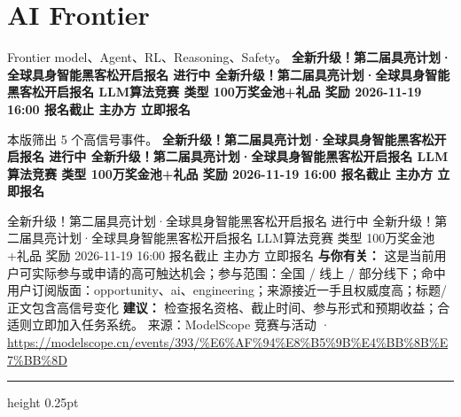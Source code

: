 \documentclass[10.5pt]{ctexart}
\begin{document}
\section*{AI Frontier}
{\color{ormuted} Frontier model、Agent、RL、Reasoning、Safety。}
\vspace{2mm}
{\LARGE\bfseries 全新升级！第二届具亮计划·全球具身智能黑客松开启报名 进行中 全新升级！第二届具亮计划·全球具身智能黑客松开启报名 LLM算法竞赛 类型 100万奖金池+礼品 奖励 2026-11-19 16:00 报名截止 主办方 立即报名}\par
\vspace{1mm}
{\color{ormuted} 本版筛出 5 个高信号事件。}
\vspace{3mm}
{\Large\bfseries 全新升级！第二届具亮计划·全球具身智能黑客松开启报名 进行中 全新升级！第二届具亮计划·全球具身智能黑客松开启报名 LLM算法竞赛 类型 100万奖金池+礼品 奖励 2026-11-19 16:00 报名截止 主办方 立即报名}\par
全新升级！第二届具亮计划·全球具身智能黑客松开启报名 进行中 全新升级！第二届具亮计划·全球具身智能黑客松开启报名 LLM算法竞赛 类型 100万奖金池+礼品 奖励 2026-11-19 16:00 报名截止 主办方 立即报名
\textbf{与你有关：} 这是当前用户可实际参与或申请的高可触达机会；参与范围：全国 / 线上 / 部分线下；命中用户订阅版面：opportunity、ai、engineering；来源接近一手且权威度高；标题/正文包含高信号变化
\textbf{建议：} 检查报名资格、截止时间、参与形式和预期收益；合适则立即加入任务系统。
{\footnotesize\color{ormuted} 来源：ModelScope 竞赛与活动 · \url{https://modelscope.cn/events/393/%E6%AF%94%E8%B5%9B%E4%BB%8B%E7%BB%8D}}
\vspace{4mm}
\hrule height 0.25pt
\vspace{3mm}
\end{document}
